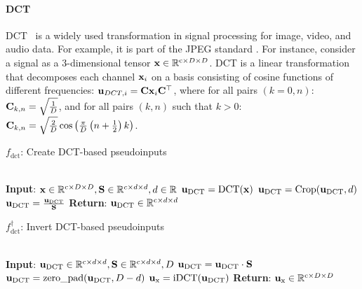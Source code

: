 \paragraph{DCT} DCT~\citep{ahmed1974discrete} is a widely used transformation in signal processing for image, video, and audio data. For example, it is part of the JPEG standard \citep{pennebaker1992jpeg}. 
For instance, consider a signal as a $3$-dimensional tensor ${\mathbf{x}} \in \mathbb{R}^{\text{c} \times D \times D}$. DCT is a linear transformation that decomposes each channel ${\mathbf{x}}_{i}$ on a basis consisting of cosine functions of different frequencies: ${\mathbf{u}}_{DCT, i} = {\mathbf{C}} {\mathbf{x}}_{i} {\mathbf{C}}^{\top}$, where for all pairs $(k=0,n)$: ${\mathbf{C}}_{k,n} = \sqrt{\frac{1}{D}}$,  and for all pairs $(k,n)$ such that $k>0$: ${\mathbf{C}}_{k,n} = \sqrt{\frac{2}{D}} \cos \left(\frac{\pi}{D}\left(n+\frac{1}{2}\right) k\right)$. 
 

\begin{algorithm}[t] %
\caption{$f_{\text{dct}}$: Create DCT-based pseudoinputs}
\label{alg:context_forward}
\begin{algorithmic}
 \\\hrulefill
        \State \hskip-3mm \textbf{Input}: ${\mathbf{x}} \in \mathbb{R}^{\text{c} \times D \times D}, {\mathbf{S}}\in \mathbb{R}^{c \times d \times d}, d \in \mathbb{R}$
    \State ${\mathbf{u}}_{\text{DCT}} = \text{DCT}({\mathbf{x}})$
        \State ${\mathbf{u}}_{\text{DCT}} = \text{Crop}({\mathbf{u}}_{\text{DCT}}, d)$ %
        \State ${\mathbf{u}}_{\text{DCT}} = \frac{{\mathbf{u}}_{\text{DCT}}}{{\mathbf{S}}} $  %
        \State  \hskip-3mm \textbf{Return}: ${\mathbf{u}}_{\text{DCT}}\in \mathbb{R}^{\text{c} \times d \times d}$
\end{algorithmic}
\end{algorithm}
\begin{algorithm}[t] %
\caption{$f^{\dagger}_{\text{dct}}$: Invert DCT-based pseudoinputs}
\label{alg:context_backward}
\begin{algorithmic} %
 \\\hrulefill
        \State \hskip-3mm \textbf{Input}: ${\mathbf{u}}_{\text{DCT}} \in \mathbb{R}^{\text{c} \times d \times d}, {\mathbf{S}} \in \mathbb{R}^{\text{c} \times d \times d}, D$
        \State ${\mathbf{u}}_{\text{DCT}} = {\mathbf{u}}_{\text{DCT}} \cdot {\mathbf{S}}$
        \State ${\mathbf{u}}_{\text{DCT}} = \text{zero\_pad}({\mathbf{u}}_{\text{DCT}}, D-d)$%
        \State ${\mathbf{u}}_{\text{x}} = \text{iDCT}({\mathbf{u}}_{\text{DCT}})$ %
        \State \hskip-3mm \textbf{Return}: ${\mathbf{u}}_{\text{x}} \in \mathbb{R}^{\text{c} \times D \times D}$
\end{algorithmic}
\end{algorithm}

